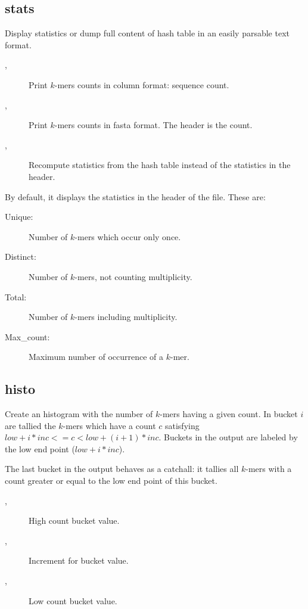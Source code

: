 \documentclass[english]{article}
\begin{document}
\subsection{stats}

Display statistics or dump full content of hash table in an easily
parsable text format.

\begin{description}
\item[,] Print $k$-mers counts in column format: sequence count.
\item[,] Print $k$-mers counts in fasta format. The header is the count.
\item[,] Recompute statistics from the hash
  table instead of the statistics in the header.
\end{description}

By default, it displays the statistics in the header of the file. These are:

\begin{description}
\item[Unique:] Number of $k$-mers which occur only once.
\item[Distinct:] Number of $k$-mers, not counting multiplicity.
\item[Total:] Number of $k$-mers including multiplicity.
\item[Max\_count:] Maximum number of occurrence of a $k$-mer.
\end{description}

\subsection{histo}

Create an histogram with the number of $k$-mers having a given count. In bucket $i$ are tallied the $k$-mers which have a count $c$ satisfying $low+i*inc<=c<low+(i+1)*inc$. Buckets in the output are labeled by the low end point ($low+i*inc$).

The last bucket in the output behaves as a catchall: it tallies all
$k$-mers with a count greater or equal to the low end point of this
bucket.

\begin{description}
\item[,] High count bucket value.
\item[,] Increment for bucket value.
\item[,] Low count bucket value.
\end{description}
\end{document}
